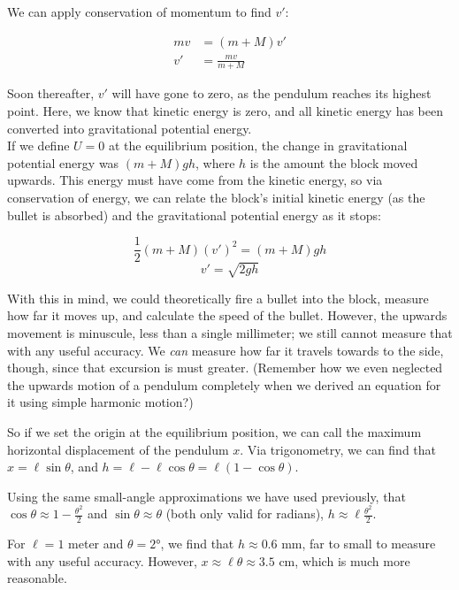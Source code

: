 We can apply conservation of momentum to find $v'$:

\begin{align}
m v &= (m + M) v'\\
v' &= \frac	{m v}{m + M}
\end{align}

Soon thereafter, $v'$ will have gone to zero, as the pendulum reaches its highest point. Here, we know that kinetic energy is zero, and all kinetic energy has been converted into gravitational potential energy.\\
If we define $U = 0$ at the equilibrium position, the change in gravitational potential energy was $(m + M) g h$, where $h$ is the amount the block moved upwards. This energy must have come from the kinetic energy, so via conservation of energy, we can relate the block's initial kinetic energy (as the bullet is absorbed) and the gravitational potential energy as it stops:

\begin{equation}
\frac{1}{2} (m + M) (v')^2 = (m + M) g h
\end{equation}
\begin{equation}
v' = \sqrt{2 g h}
\end{equation}

With this in mind, we could theoretically fire a bullet into the block, measure how far it moves up, and calculate the speed of the bullet. However, the upwards movement is minuscule, less than a single millimeter; we still cannot measure that with any useful accuracy. We \emph{can} measure how far it travels towards to the side, though, since that excursion is must greater. (Remember how we even neglected the upwards motion of a pendulum completely when we derived an equation for it using simple harmonic motion?)

So if we set the origin at the equilibrium position, we can call the maximum horizontal displacement of the pendulum $x$. Via trigonometry, we can find that $x = \ell \sin \theta$, and $h = \ell - \ell \cos \theta = \ell(1 - \cos \theta)$.

Using the same small-angle approximations we have used previously, that $\displaystyle \cos \theta \approx 1 - \frac{\theta^2}{2}$ and $\sin \theta \approx \theta$ (both only valid for radians), $\displaystyle h \approx \ell \frac{\theta^2}{2}$.

For $\ell = 1$ meter and $\theta = \ang{2}$, we find that $h \approx 0.6$ mm, far to small to measure with any useful accuracy. However, $x \approx \ell \theta \approx 3.5$ cm, which is much more reasonable. 


